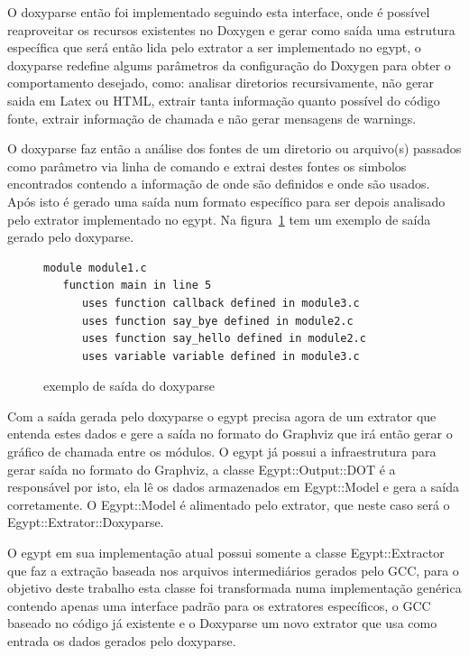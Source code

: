 O doxyparse então foi implementado seguindo esta interface, onde é possível
reaproveitar os recursos existentes no Doxygen e gerar como saída uma estrutura
específica que será então lida pelo extrator a ser implementado no egypt, o
doxyparse redefine algums parâmetros da configuração do Doxygen para obter o
comportamento desejado, como: analisar diretorios recursivamente, não gerar
saida em Latex ou HTML, extrair tanta informação quanto possível do código
fonte, extrair informação de chamada e não gerar mensagens de warnings.

O doxyparse faz então a análise dos fontes de um diretorio ou arquivo(s)
passados como parâmetro via linha de comando e extrai destes fontes os simbolos
encontrados contendo a informação de onde são definidos e onde são usados. Após
isto é gerado uma saída num formato específico para ser depois analisado pelo
extrator implementado no egypt. Na figura~\ref{exemplo-saida-doxyparse} tem um
exemplo de saída gerado pelo doxyparse.

\begin{figure}[h]
\begin{Verbatim}[frame=single,fontsize=\relsize{-2},fontfamily=courier]
module module1.c
   function main in line 5
      uses function callback defined in module3.c
      uses function say_bye defined in module2.c
      uses function say_hello defined in module2.c
      uses variable variable defined in module3.c
\end{Verbatim}
\label{exemplo-saida-doxyparse}
\caption{exemplo de saída do doxyparse}
\end{figure}

Com a saída gerada pelo doxyparse o egypt precisa agora de um extrator que
entenda estes dados e gere a saída no formato do Graphviz que irá então gerar o
gráfico de chamada entre os módulos. O egypt já possui a infraestrutura
para gerar saída no formato do Graphviz, a classe Egypt::Output::DOT é a
responsável por isto, ela lê os dados armazenados em Egypt::Model e gera a
saída corretamente. O Egypt::Model é alimentado pelo extrator, que neste caso será
o Egypt::Extrator::Doxyparse.

O egypt em sua implementação atual possui somente a classe Egypt::Extractor que
faz a extração baseada nos arquivos intermediários gerados pelo GCC, para o
objetivo deste trabalho esta classe foi transformada numa implementação
genérica contendo apenas uma interface padrão para os extratores específicos, o
GCC baseado no código já existente e o Doxyparse um novo extrator que usa como
entrada os dados gerados pelo doxyparse.


